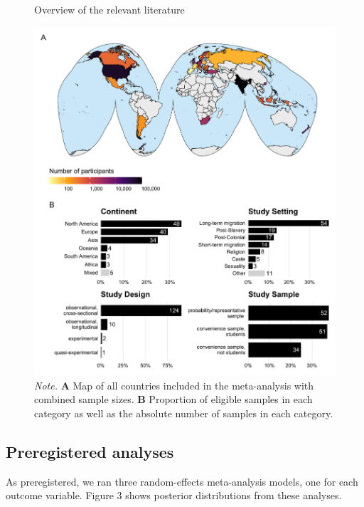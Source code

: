 \documentclass[twocolumn, 10pt, letterpaper]{article}
\begin{document}
\begin{figure}
\centering
\caption{Overview of the relevant literature}
\includegraphics[scale=1]{../figures/figure-2}
\caption*{\textit{Note.} \textbf{A} Map of all countries included in the meta-analysis with combined sample sizes. \textbf{B} Proportion of eligible samples in each category as well as the absolute number of samples in each category.}
\label{fig:f2}
\end{figure}

\hypertarget{preregistered-analyses}{%
\subsection{Preregistered analyses}\label{preregistered-analyses}}

As preregistered, we ran three random-effects meta-analysis models, one
for each outcome variable. Figure 3 shows posterior distributions from
these analyses.
\end{document}
